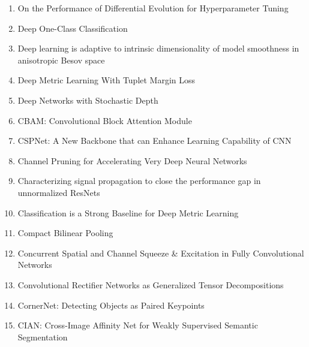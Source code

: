 \documentclass[acmlarge]{acmart}
\begin{document}
\begin{enumerate}
	\item On the Performance of Differential Evolution for Hyperparameter Tuning \cite{Schmidt2019OnTP} 

	\item Deep One-Class Classification \cite{Ruff2018DeepOC} 

	\item Deep learning is adaptive to intrinsic dimensionality of model smoothness in anisotropic Besov space \cite{Suzuki2019DeepLI} 

	\item Deep Metric Learning With Tuplet Margin Loss \cite{Yu2019DeepML} 

	\item Deep Networks with Stochastic Depth \cite{Huang2016DeepNW} 

	\item CBAM: Convolutional Block Attention Module \cite{Woo2018CBAMCB} 

	\item CSPNet: A New Backbone that can Enhance Learning Capability of CNN \cite{Wang2020CSPNetAN} 

	\item Channel Pruning for Accelerating Very Deep Neural Networks \cite{He2017ChannelPF} 

	\item Characterizing signal propagation to close the performance gap in unnormalized ResNets \cite{Brock2021CharacterizingSP} 

	\item Classification is a Strong Baseline for Deep Metric Learning \cite{Zhai2019ClassificationIA} 

	\item Compact Bilinear Pooling \cite{Gao2016CompactBP} 

	\item Concurrent Spatial and Channel Squeeze \& Excitation in Fully Convolutional Networks \cite{Roy2018ConcurrentSA} 

	\item Convolutional Rectifier Networks as Generalized Tensor Decompositions \cite{Cohen2016ConvolutionalRN} 

	\item CornerNet: Detecting Objects as Paired Keypoints \cite{Law2018CornerNetDO} 

	\item CIAN: Cross-Image Affinity Net for Weakly Supervised Semantic Segmentation \cite{Fan2020CIANCA} 


\end{enumerate}
\end{document}
